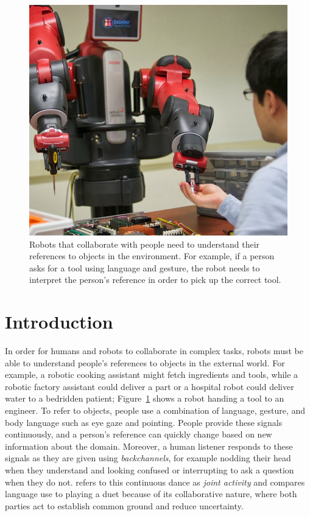 \documentclass[graybox]{svmult}
\begin{document}
{\begin{figure}
\includegraphics[width=1\linewidth]{figures/baxter_scene_cropped.jpg}
\caption{Robots that collaborate with people need to understand their
  references to objects in the environment.  For example, if a person
  asks for a tool using language and gesture, the robot needs to
  interpret the person's reference in order to pick up the correct
  tool.\label{fig:example}}
\end{figure}
}


\section{Introduction}

In order for humans and robots to collaborate in complex tasks, robots
must be able to understand people's references to objects in the
external world.  For example, a robotic cooking assistant might fetch
ingredients and tools, while a robotic factory assistant could deliver
a part or a hospital robot could deliver water to a bedridden patient;
Figure~\ref{fig:example} shows a robot handing a tool to an engineer.
To refer to objects, people use a combination of language, gesture,
and body language such as eye gaze and pointing.  People provide these
signals continuously, and a person's reference can quickly change
based on new information about the domain.  Moreover, a human listener
responds to these signals as they are given using {\em backchannels},
for example nodding their head when they understand and looking
confused or interrupting to ask a question when they do not.
\citet{clark96} refers to this continuous dance as {\em joint
  activity} and compares language use to playing a duet because of its
collaborative nature, where both parties act to establish common
ground and reduce uncertainty.  
\end{document}
